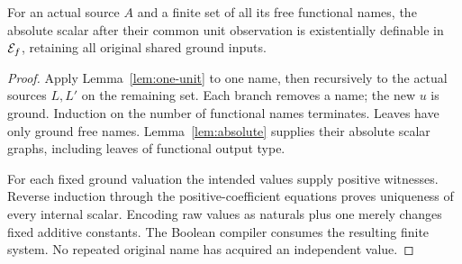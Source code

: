 \begin{theorem}\label{thm:unit-elimination}
For an actual source $A$ and a finite set of all its free functional names,
the absolute scalar after their common unit observation is existentially
definable in $\mathcal E_f$, retaining all original shared ground inputs.
\end{theorem}
\begin{proof}
Apply Lemma~\ref{lem:one-unit} to one name, then recursively to the actual
sources $L,L'$ on the remaining set.  Each branch removes a name; the new
$u$ is ground.  Induction on the number of functional names terminates.
Leaves have only ground free names.  Lemma~\ref{lem:absolute} supplies their
absolute scalar graphs, including leaves of functional output type.

For each fixed ground valuation the intended values supply positive witnesses.
Reverse induction through the positive-coefficient equations proves uniqueness
of every internal scalar.  Encoding raw values as naturals plus one merely
changes fixed additive constants.  The Boolean compiler consumes the resulting
finite system.  No repeated original name has acquired an independent value.
\end{proof}

